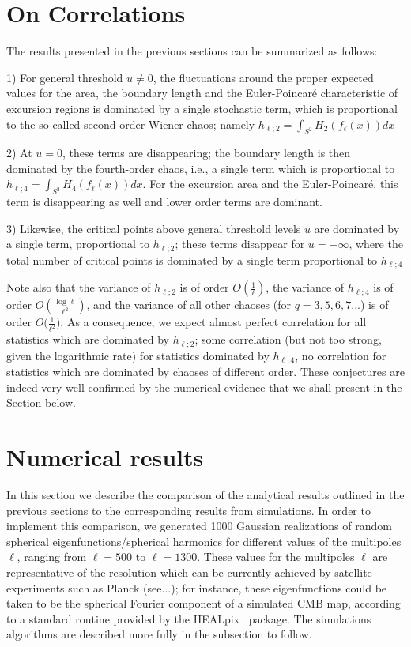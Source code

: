 \documentclass[aps,prd,showpacs,superscriptaddress,groupedaddress]{revtex4-1}  %
\newcommand{\healpix}{HEALpix~}
\begin{document}
\section{On Correlations}

The results presented in the previous sections can be summarized as follows:

1) For general threshold $u \neq 0$, the fluctuations around the proper expected values for the area, the boundary length and the Euler-Poincar\'e characteristic of excursion regions is dominated by a single stochastic term, which is proportional to the so-called second order Wiener chaos; namely $h_{\ell;2}=\int_{S^2} H_2(f_{\ell}(x))dx$


2) At $u=0$, these terms are disappearing; the boundary length is then dominated by the fourth-order chaos, i.e., a single term which is proportional to $h_{\ell;4}=\int_{S^2} H_4(f_{\ell}(x))dx$. For the excursion area and the Euler-Poincar\'e, this term is disappearing as well and lower order terms are dominant. 


3) Likewise, the critical points above general threshold levels $u$ are dominated by a single term, proportional to $h_{\ell;2}$; these terms disappear for $u=-\infty$, where the total number of critical points is dominated by a single term proportional to $h_{\ell;4}$  

Note also that the variance of $h_{\ell;2}$ is of order $O(\frac{1}{\ell})$, the variance of $h_{\ell;4}$ is of order $O(\frac{\log\ell}{\ell^2})$, and the variance of all other chaoses (for $q=3,5,6,7...$) is of order $O(\frac{1}{\ell^2}$). As a consequence, we expect almost perfect correlation for all statistics which are dominated by $h_{\ell;2}$; some correlation (but not too strong, given the logarithmic rate) for statistics dominated by $h_{\ell;4}$, no correlation for statistics which are dominated by chaoses of different order. These conjectures are indeed very well confirmed by the numerical evidence that we shall present in the Section below.


\section{Numerical results}\label{sec:numerical}

In this section we describe the comparison of the analytical
results outlined in the previous sections to the corresponding
results from simulations.  In order to implement this comparison, we generated 1000 Gaussian
realizations of random spherical eigenfunctions/spherical harmonics for different values of the multipoles $\ell$, ranging from $\ell=500$ to $\ell=1300$. These values for the multipoles $\ell$ are representative of the resolution which can be currently achieved by satellite experiments such as Planck (see...); for instance, these eigenfunctions could be taken to be the spherical Fourier component of a simulated CMB map, according to a standard routine provided by the \healpix\cite{healpix} package. The simulations algorithms are described more fully in the subsection to follow.
\end{document}
